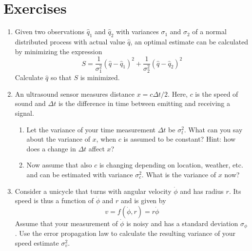 \section*{Exercises}\small
\begin{enumerate}
\item Given two observations $\hat{q}_1$ and $\hat{q}_2$ with variances $\sigma_1$ and $\sigma_2$ of a normal distributed process with actual value $\hat{q}$, an optimal estimate can be calculated by minimizing the expression
\begin{equation}
\nonumber
S=\frac{1}{\sigma_1^2}(\hat{q}-\hat{q}_1)^2+\frac{1}{\sigma_2^2}(\hat{q}-\hat{q}_2)^2
\end{equation}
Calculate $\hat{q}$ so that $S$ is minimized.
\item An ultrasound sensor measures distance $x=c\Delta t/2$. Here, $c$ is the speed of sound and $\Delta t$ is the difference in time between emitting and receiving a signal.
\begin{enumerate}
\item Let the variance of your time measurement $\Delta t$ be $\sigma_t^2$. What can you say about the variance of $x$, when $c$ is assumed to be constant? Hint: how does a change in $\Delta t$ affect $x$?
\item Now assume that also $c$ is changing depending on location, weather, etc. and can be estimated with variance $\sigma_c^2$. What is the variance of $x$ now?
\end{enumerate}
\item Consider a unicycle that turns with angular velocity $\dot{\phi}$ and has radius $r$. Its speed is thus a function of $\dot{\phi}$ and $r$ and is given by
\begin{equation}
\nonumber
v=f(\dot{\phi},r)=r\dot{\phi}
\end{equation} 
Assume that your measurement of $\dot{\phi}$ is noisy and has a standard deviation $\sigma_{\phi}$.  Use the error propagation law to calculate the resulting variance of your speed estimate $\sigma_v^2$. 
\end{enumerate}
\normalsize
